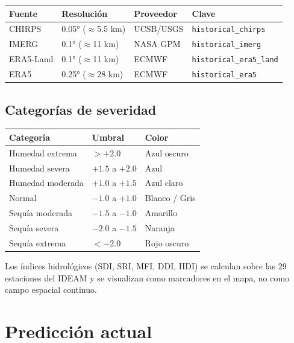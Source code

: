 \begin{center}
\small
\begin{tabular}{@{}llll@{}}
\toprule
\textbf{Fuente} & \textbf{Resolución} & \textbf{Proveedor} & \textbf{Clave} \\
\midrule
CHIRPS    & 0.05° ($\approx$5.5 km)& UCSB/USGS  & \texttt{historical\_chirps} \\
IMERG     & 0.1° ($\approx$11 km) & NASA GPM    & \texttt{historical\_imerg} \\
ERA5-Land & 0.1° ($\approx$11 km) & ECMWF       & \texttt{historical\_era5\_land} \\
ERA5      & 0.25° ($\approx$28 km)& ECMWF       & \texttt{historical\_era5} \\
\bottomrule
\end{tabular}
\end{center}

\subsection*{Categorías de severidad}

\begin{center}
\small
\begin{tabular}{@{}lll@{}}
\toprule
\textbf{Categoría} & \textbf{Umbral} & \textbf{Color} \\
\midrule
Humedad extrema  & $>{+2.0}$       & Azul oscuro \\
Humedad severa   & $+1.5$ a $+2.0$ & Azul \\
Humedad moderada & $+1.0$ a $+1.5$ & Azul claro \\
Normal           & $-1.0$ a $+1.0$ & Blanco / Gris \\
Sequía moderada  & $-1.5$ a $-1.0$ & Amarillo \\
Sequía severa    & $-2.0$ a $-1.5$ & Naranja \\
Sequía extrema   & ${<-2.0}$       & Rojo oscuro \\
\bottomrule
\end{tabular}
\end{center}

\begin{remark}
Los índices hidrológicos (SDI, SRI, MFI, DDI, HDI) se calculan sobre las 29 estaciones del IDEAM y se visualizan como marcadores en el mapa, no como campo espacial continuo.
\end{remark}

\section{Predicción actual}
\label{sec:prediccion_actual}

